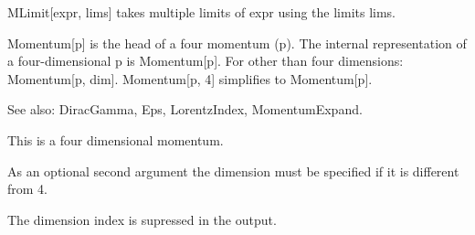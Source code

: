 




MLimit[expr, lims] takes multiple limits of expr using the limits lims.






Momentum[p] is the head of a four momentum (p). The internal representation of a four-dimensional p is Momentum[p]. For other than four
  dimensions: Momentum[p, dim]. Momentum[p, 4] simplifies to Momentum[p].

See also:  DiracGamma, Eps, LorentzIndex, MomentumExpand.


This is a four dimensional momentum.



As an optional second argument the dimension must be specified if it is different from 4.



The dimension index is supressed in the output.






